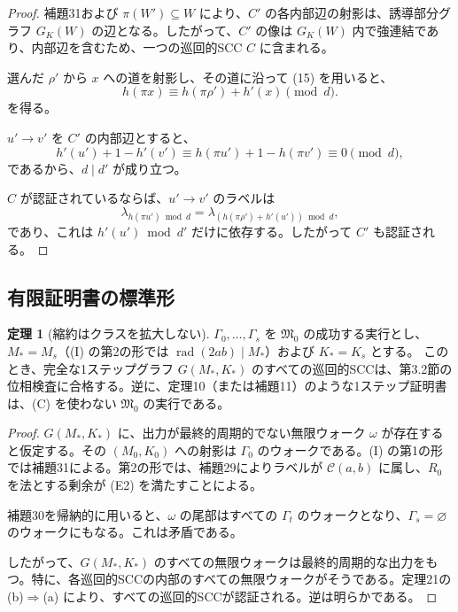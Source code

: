 \documentclass[11pt,reqno]{amsart}
\theoremstyle{definition}
\newtheorem{theorem}{定理}
\theoremstyle{definition}
\theoremstyle{remark}
\begin{document}
\begin{proof}\leavevmode\label{proof:32}
補題31および \(\pi(W')\subseteq W\) により、\(C'\) の各内部辺の射影は、誘導部分グラフ \(G_K(W)\) の辺となる。したがって、\(C'\) の像は \(G_K(W)\) 内で強連結であり、内部辺を含むため、一つの巡回的SCC \(C\) に含まれる。

選んだ \(\rho'\) から \(x\) への道を射影し、その道に沿って (15) を用いると、
\[
h(\pi x)\equiv h(\pi\rho')+h'(x)\pmod d.
\]
を得る。

\(u'\to v'\) を \(C'\) の内部辺とすると、
\[
h'(u')+1-h'(v')\equiv h(\pi u')+1-h(\pi v')
\equiv0\pmod d,
\]
であるから、\(d\mid d'\) が成り立つ。

\(C\) が認証されているならば、\(u'\to v'\) のラベルは
\[
\lambda_{h(\pi u')\bmod d}
=\lambda_{(h(\pi\rho')+h'(u'))\bmod d},
\]
であり、これは \(h'(u')\bmod d'\) だけに依存する。したがって \(C'\) も認証される。\qedhere
\end{proof}

\subsection{有限証明書の標準形}\label{sec:7.4}

\begin{samepage}
\begin{theorem}[縮約はクラスを拡大しない]\leavevmode\label{thm:33}
\(\Gamma_0,\ldots,\Gamma_s\) を \(\mathfrak M_0\) の成功する実行とし、\(M_*=M_s\)（(I) の第2の形では \(\operatorname{rad}(2ab)\mid M_*\)）および \(K_*=K_s\) とする。
このとき、完全な1ステップグラフ \(G(M_*,K_*)\) のすべての巡回的SCCは、第3.2節の位相検査に合格する。逆に、定理10（または補題11）のような1ステップ証明書は、(C) を使わない \(\mathfrak M_0\) の実行である。
\label{thm-end:33}
\end{theorem}
\end{samepage}

\begin{proof}\leavevmode\label{proof:33}
\(G(M_*,K_*)\) に、出力が最終的周期的でない無限ウォーク \(\omega\) が存在すると仮定する。その \((M_0,K_0)\) への射影は \(\Gamma_0\) のウォークである。(I) の第1の形では補題31による。第2の形では、補題29によりラベルが \(\mathcal C(a,b)\) に属し、\(R_0\) を法とする剰余が (E2) を満たすことによる。

補題30を帰納的に用いると、\(\omega\) の尾部はすべての \(\Gamma_t\) のウォークとなり、\(\Gamma_s=\varnothing\) のウォークにもなる。これは矛盾である。

したがって、\(G(M_*,K_*)\) のすべての無限ウォークは最終的周期的な出力をもつ。特に、各巡回的SCCの内部のすべての無限ウォークがそうである。定理21の (b)\(\Rightarrow\)(a) により、すべての巡回的SCCが認証される。逆は明らかである。\qedhere
\end{proof}
\end{document}
